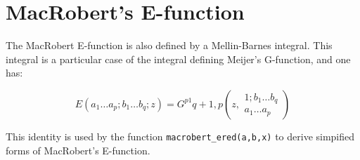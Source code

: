 \documentclass[11pt]{article}
\begin{document}
\section{MacRobert's E-function}

The MacRobert E-function\cite{macrobert1958,macrobert1959c,macrobert1959b,macrobert1959a,macrobert1959,macrobert1960,macrobert1960a,macrobert1961,macrobert1961a,macrobert1962,macrobert1962a,ragab1962,ragab1993,ragab1962a,ragab1954} is also defined by a Mellin-Barnes integral. 
This integral is a particular case of the integral defining 
Meijer's G-function, and one has:

\begin{equation}
  E(a_1\ldots a_p;b_1\ldots b_q;z)=G^{p1}{q+1,p}\left(z,\begin{array}{c} 1;b_1\ldots b_q\\ a_1\ldots a_p \end{array} \right)
\end{equation}

This identity is used by the function \texttt{macrobert\_ered(a,b,x)} to derive simpified forms of MacRobert's E-function.

 

% 
%
\end{document}
